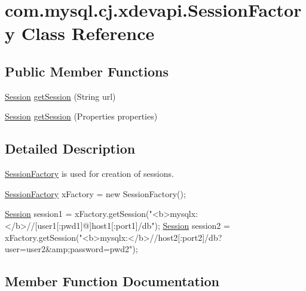 \hypertarget{classcom_1_1mysql_1_1cj_1_1xdevapi_1_1_session_factory}{}\section{com.\+mysql.\+cj.\+xdevapi.\+Session\+Factory Class Reference}
\label{classcom_1_1mysql_1_1cj_1_1xdevapi_1_1_session_factory}
\subsection*{Public Member Functions}
\begin{DoxyCompactItemize}
\item 
\mbox{\hyperlink{interfacecom_1_1mysql_1_1cj_1_1xdevapi_1_1_session}{Session}} \mbox{\hyperlink{classcom_1_1mysql_1_1cj_1_1xdevapi_1_1_session_factory_a3fda3a0cf7e75e290606aa778a8ed3ef}{get\+Session}} (String url)
\item 
\mbox{\hyperlink{interfacecom_1_1mysql_1_1cj_1_1xdevapi_1_1_session}{Session}} \mbox{\hyperlink{classcom_1_1mysql_1_1cj_1_1xdevapi_1_1_session_factory_ada2639565b22428f9b0ec6f07d925309}{get\+Session}} (Properties properties)
\end{DoxyCompactItemize}


\subsection{Detailed Description}
\mbox{\hyperlink{classcom_1_1mysql_1_1cj_1_1xdevapi_1_1_session_factory}{Session\+Factory}} is used for creation of sessions.


\begin{DoxyPre}
\mbox{\hyperlink{classcom_1_1mysql_1_1cj_1_1xdevapi_1_1_session_factory}{SessionFactory}} xFactory = new SessionFactory();\end{DoxyPre}



\begin{DoxyPre}\mbox{\hyperlink{interfacecom_1_1mysql_1_1cj_1_1xdevapi_1_1_session}{Session}} session1 = xFactory.getSession("<b>mysqlx:</b>//[user1[:pwd1]@]host1[:port1]/db");
\mbox{\hyperlink{interfacecom_1_1mysql_1_1cj_1_1xdevapi_1_1_session}{Session}} session2 = xFactory.getSession("<b>mysqlx:</b>//host2[:port2]/db?user=user2&amp;password=pwd2");
\end{DoxyPre}
 

\subsection{Member Function Documentation}
\mbox{\label{classcom_1_1mysql_1_1cj_1_1xdevapi_1_1_session_factory_a3fda3a0cf7e75e290606aa778a8ed3ef}} 
